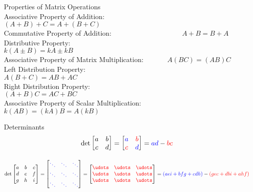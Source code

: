 \documentclass[12pt]{article}
\numberwithin{equation}{subsection}
\begin{document}
\begin{flushleft}
Properties of Matrix Operations\\
 \bigskip 
Associative Property of Addition: \ \ \  \ \ \ \ \ \ \ \ \ \ \ \ \ \ \ \ \ \ \ \ $(A+B)+C=A+(B+C)$\\
Commutative Property of Addition: \  \ \ \ \ \ \ \  \ \ \ \ \ \ \ \ \ \ \ \ $A+B=B+A$\\
Distributive Property: \ \ \ \ \ \ \ \ \ \ \ \ \ \ \ \ \ \ \ \ \ \ \ \ \ \ \ \ \ \ \ \ \ \ \ \ \ \ $k(A \pm B)= kA \pm kB$\\
Associative Property of Matrix Multiplication:\ \ \ \ \ \ \   $A(BC)=(AB)C$\\
Left Distribution Property: \ \ \ \ \ \ \ \ \ \ \ \ \ \ \ \ \ \ \ \ \ \ \ \ \ \ \ \ \ \ \ $A(B+C)=AB+AC$\\
Right Distribution Property: \ \ \ \ \ \ \ \ \ \ \ \  \ \ \ \ \ \ \  \ \ \ \ \ \ \ \ \ \ $(A+B)C=AC+BC$\\
Associative Property of Scalar Multiplication: \ \ \ \ \ \ \ $k(AB)=(kA)B=A(kB)$\\
\bigskip

Determinants
\begin{equation}
\textrm{det} \begin{bmatrix}
a & b \\
c & d \\
\end{bmatrix}
=
\begin{bmatrix}
\textcolor{blue}{a} & \textcolor{red}{b}\\
\textcolor{red}{c} & \textcolor{blue}{d}\\
\end{bmatrix}
=
\textcolor{blue}{ad}-\textcolor{red}{bc}
\end{equation}

\begin{equation}
\textrm{det} \begin{bmatrix}
a & b & c \\
d & e & f \\
g & h & i \\
\end{bmatrix}
=
\begin{bmatrix}
\textcolor{blue}{\ddots} & \textcolor{blue}{\ddots} & \textcolor{blue}{\ddots} \\
\textcolor{blue}{\ddots} & \textcolor{blue}{\ddots} & \textcolor{blue}{\ddots} \\
\textcolor{blue}{\ddots} & \textcolor{blue}{\ddots} & \textcolor{blue}{\ddots} \\
\end{bmatrix}
=
\begin{bmatrix}
\textcolor{red}{\udots} & \textcolor{red}{\udots} & \textcolor{red}{\udots} \\
\textcolor{red}{\udots} & \textcolor{red}{\udots} & \textcolor{red}{\udots} \\
\textcolor{red}{\udots} & \textcolor{red}{\udots} & \textcolor{red}{\udots} \\
\end{bmatrix}=
\textcolor{blue}{(aei+bfg+cdh)}-\textcolor{red}{(gec+dbi+ahf)}
\end{equation}



\end{flushleft}
\end{document}
